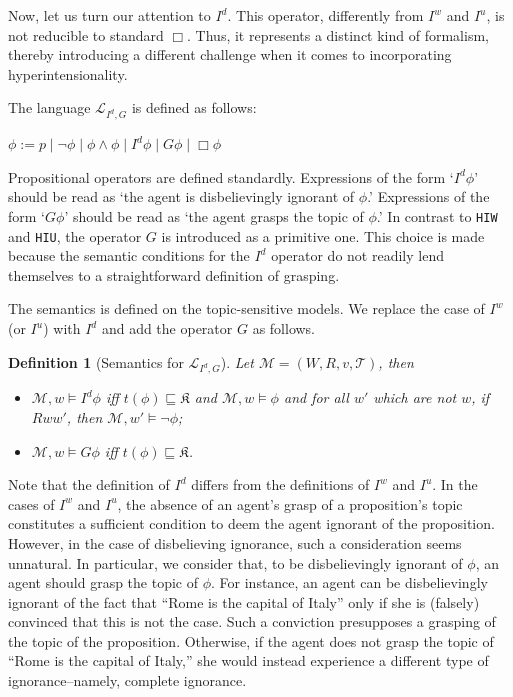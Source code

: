 \documentclass{article}
\newtheorem{defi}{Definition}
\begin{document}
Now, let us turn our attention to $I^{d}$. This operator, differently from $I^{w}$ and $I^{u}$, is not  reducible to standard $\Box$. Thus, it represents a distinct kind of formalism, thereby introducing a different challenge when it comes to incorporating hyperintensionality.

The language $\mathcal{L}_{I^{d}, G}$ is defined as follows:

\begin{center}

$ \phi:= p \mid \neg \phi \mid \phi \wedge \phi \mid I^{d} \phi \mid G \phi \mid \Box \phi$

\end{center}

Propositional operators are defined standardly. Expressions of the form `$I^{d} \phi$' should be read as `the agent is disbelievingly ignorant of $\phi$.' Expressions of the form `$G \phi$' should be read as `the agent grasps the topic of $\phi$.' In contrast to \texttt{HIW} and \texttt{HIU}, the operator $G$ is introduced as a primitive one. This choice is made because the semantic conditions for the $I^{d}$ operator do not readily lend themselves to a straightforward definition of grasping.

The semantics is defined on the topic-sensitive models. We replace the case of $I^{w}$ (or $I^{u}$) with $I^{d}$ and add the operator $G$ as follows.

\begin{defi}[Semantics for $\mathcal{L}_{I^{d}, G}$]

Let $\mathcal{M} = (W, R, v, \mathcal{T})$, then

\begin{itemize}

\item $\mathcal{M}, w \models I^{d} \phi$ iff $t(\phi) \sqsubseteq \mathfrak{K}$ and $\mathcal{M}, w \models \phi$ and for all $w'$ which are not $w$, if $Rww'$, then $\mathcal{M}, w' \models \neg \phi$;

\item $\mathcal{M}, w \models G \phi$ iff $t(\phi) \sqsubseteq \mathfrak{K}$.

\end{itemize}


\end{defi}

Note that the definition of $I^{d}$ differs from the definitions of $I^{w}$ and $I^{u}$. In the cases of $I^{w}$ and $I^{u}$, the absence of an agent's grasp of a proposition's topic constitutes a sufficient condition to deem the agent ignorant of the proposition. However, in the case of disbelieving ignorance, such a consideration seems unnatural. In particular, we consider that, to be disbelievingly ignorant of $\phi$, an agent should grasp the topic of $\phi$. For instance, an agent can be disbelievingly ignorant of the fact that ``Rome is the capital of Italy'' only if she is (falsely) convinced that this is not the case. Such a conviction presupposes a grasping of the topic of the proposition. Otherwise, if the agent does not grasp the topic of ``Rome is the capital of Italy,'' she would instead experience a different type of ignorance--namely, complete ignorance.
\end{document}
